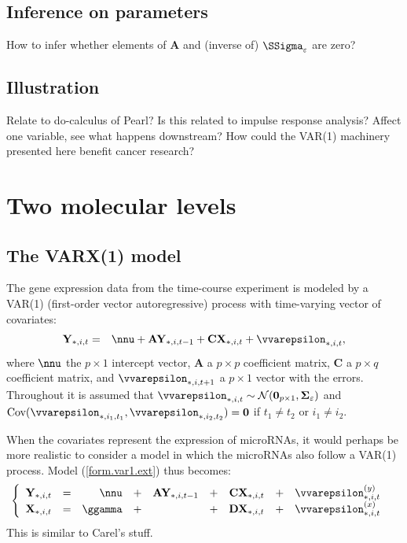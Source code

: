 \documentclass[a4paper]{article}
\theoremstyle{myexamplestyle}
\begin{document}
\subsection{Inference on parameters}
How to infer whether elements of $\mathbf{A}$ and (inverse of) $\SSigma_{\varepsilon}$ are zero?

\subsection{Illustration}
Relate to do-calculus of Pearl? Is this related to impulse response analysis? Affect one variable, see what happens downstream? How could the VAR(1) machinery presented here benefit cancer research?


\newpage
\section{Two molecular levels}
\subsection{The VARX(1) model}
The gene expression data from the time-course experiment is modeled by a VAR(1) (first-order vector autoregressive) process with time-varying vector of covariates:
\begin{eqnarray} \label{form.var1.ext}
\mathbf{Y}_{\ast,i,t} %
& = & \nnu + \mathbf{A} \mathbf{Y}_{\ast,i,t-1}
+ \mathbf{C} \mathbf{X}_{\ast,i,t} + \vvarepsilon_{\ast,i,t},
\end{eqnarray}
where $\nnu$ the $p \times 1$ intercept vector, $\mathbf{A}$ a $p \times p$ coefficient matrix, $\mathbf{C}$ a $p \times q$ coefficient matrix, and $\vvarepsilon_{\ast,i,t+1}$ a $p \times 1$ vector with the errors. Throughout it is assumed that $\vvarepsilon_{\ast,i,t} \sim \mathcal{N}(\mathbf{0}_{p \times 1}, \mathbf{\Sigma}_{\varepsilon})$
and $\mbox{Cov}(\vvarepsilon_{\ast,i_1,t_1}, \vvarepsilon_{\ast,i_2,t_2}) = \mathbf{0}$ if $t_1 \not=t_2$ or $i_1 \not=i_2$.


When the covariates represent the expression of microRNAs, it would perhaps be more realistic to consider a model in which the microRNAs also follow a VAR(1) process. Model (\ref{form.var1.ext}) thus becomes:
\begin{eqnarray*} & \label{form.var1.ext2}
\left\{
\begin{array}{lcrrrrrrr}
\mathbf{Y}_{\ast,i,t} %
& = & \nnu & + & \mathbf{A} \mathbf{Y}_{\ast,i,t-1} &
+ & \mathbf{C} \mathbf{X}_{\ast,i,t} & + & \vvarepsilon_{\ast,i,t}^{(y)}
\\
\mathbf{X}_{\ast,i,t} %
& = & \ggamma & + &  &
+ & \mathbf{D} \mathbf{X}_{\ast,i,t} & + & \vvarepsilon_{\ast,i,t}^{(x)}
\end{array}
\right.
\end{eqnarray*}
This is similar to Carel's  stuff.
\end{document}
